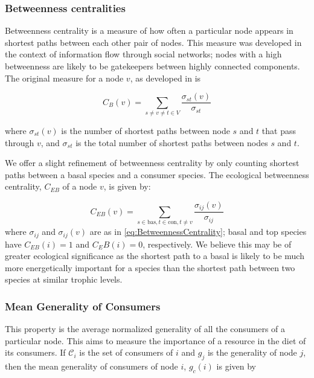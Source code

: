 \documentclass[../dissertation.tex]{subfiles}
\begin{document}
\subsubsection{Betweenness centralities} Betweenness centrality is a measure of
how often a particular node appears in shortest paths between each other pair
of nodes. This measure was developed in the context of information flow through
social networks; nodes with a high betweenness are likely to be gatekeepers
between highly connected components. The original measure for a node $v$, as developed in
\cite{Freeman1977,Anthonisse1971} is

\begin{equation} 
    C_B(v) = \sum_{s\neq v\neq t\in V}\frac{\sigma_{st}(v)}{\sigma_{st}}
\label{eq:BetweennessCentrality} 
\end{equation}

where $\sigma_{st}(v)$ is the number of shortest paths between node $s$ and $t$
that pass through $v$, and $\sigma_{st}$ is the total number of shortest paths
between nodes $s$ and $t$.

We offer a slight refinement of betweenness centrality by only counting
shortest paths between a basal species and a consumer species. The ecological
betweenness centrality, $C_{EB}$ of a node $v$, is given by:

\begin{equation} 
    C_{EB}(v) = \sum_{s\in\text{bas},t\in\text{con},t\neq v}\frac{\sigma_{ij}(v)}{\sigma_{ij}}
\label{eq:EcologicalBetweennessCentrality} 
\end{equation}
%
where $\sigma_{ij}$ and $\sigma_{ij}(v)$ are as in
\ref{eq:BetweennessCentrality}; basal and top species have $C_{EB}(i)=1$ and
$C_EB(i) = 0$, respectively. We believe this may be of greater ecological
significance as the shortest path to a basal is likely to be much more
energetically important for a species than the shortest path between two
species at similar trophic levels.

\subsubsection{Mean Generality of Consumers} This property is the average
normalized generality of all the consumers of a particular node. This aims to
measure the importance of a resource in the diet of its consumers. If
$\mathcal{C}_i$ is the set of consumers of $i$ and $g_j$ is the generality of
node $j$, then the mean generality of consumers of node $i$, $g_c(i)$ is given
by
\end{document}

